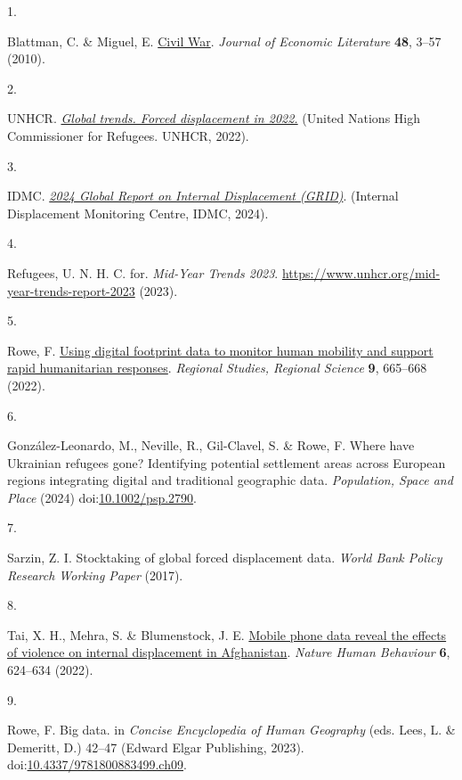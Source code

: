 \documentclass[
  11pt,
]{article}
\newlength{\cslhangindent}
\newlength{\csllabelwidth}
\newenvironment{CSLReferences}[2] %
 {\begin{list}{}{%
  \setlength{\itemindent}{0pt}
  \setlength{\leftmargin}{0pt}
  \setlength{\parsep}{0pt}
  \ifodd #1
   \setlength{\leftmargin}{\cslhangindent}
   \setlength{\itemindent}{-1\cslhangindent}
  \fi
  \setlength{\itemsep}{#2\baselineskip}}}
 {\end{list}}
\newcommand{\CSLLeftMargin}[1]{\parbox[t]{\csllabelwidth}{\strut#1\strut}}
\newcommand{\CSLRightInline}[1]{\parbox[t]{\linewidth - \csllabelwidth}{\strut#1\strut}}
\begin{document}
\label{refs}
\begin{CSLReferences}{0}{0}
\CSLLeftMargin{1. }%
\CSLRightInline{Blattman, C. \& Miguel, E.
\href{https://doi.org/10.1257/jel.48.1.3}{Civil War}. \emph{Journal of
Economic Literature} \textbf{48}, 3--57 (2010).}

\CSLLeftMargin{2. }%
\CSLRightInline{UNHCR. \emph{\href{}{Global trends. Forced displacement
in 2022.}} ({United Nations High Commissioner for Refugees. UNHCR},
2022).}

\CSLLeftMargin{3. }%
\CSLRightInline{IDMC. \emph{\href{}{2024 Global Report on Internal
Displacement {(GRID)}}}. ({Internal Displacement Monitoring Centre,
IDMC}, 2024).}

\CSLLeftMargin{4. }%
\CSLRightInline{Refugees, U. N. H. C. for. \emph{Mid-Year Trends 2023}.
\url{https://www.unhcr.org/mid-year-trends-report-2023} (2023).}

\CSLLeftMargin{5. }%
\CSLRightInline{Rowe, F.
\href{https://doi.org/10.1080/21681376.2022.2135458}{Using digital
footprint data to monitor human mobility and support rapid humanitarian
responses}. \emph{Regional Studies, Regional Science} \textbf{9},
665--668 (2022).}

\CSLLeftMargin{6. }%
\CSLRightInline{González-Leonardo, M., Neville, R., Gil-Clavel, S. \&
Rowe, F. Where have Ukrainian refugees gone? Identifying potential
settlement areas across European regions integrating digital and
traditional geographic data. \emph{Population, Space and Place} (2024)
doi:\href{https://doi.org/10.1002/psp.2790}{10.1002/psp.2790}.}

\CSLLeftMargin{7. }%
\CSLRightInline{Sarzin, Z. I. Stocktaking of global forced displacement
data. \emph{World Bank Policy Research Working Paper} (2017).}

\CSLLeftMargin{8. }%
\CSLRightInline{Tai, X. H., Mehra, S. \& Blumenstock, J. E.
\href{https://doi.org/10.1038/s41562-022-01336-4}{Mobile phone data
reveal the effects of violence on internal displacement in Afghanistan}.
\emph{Nature Human Behaviour} \textbf{6}, 624--634 (2022).}

\CSLLeftMargin{9. }%
\CSLRightInline{Rowe, F. Big data. in \emph{{Concise Encyclopedia of
Human Geography}} (eds. Lees, L. \& Demeritt, D.) 42--47 (Edward Elgar
Publishing, 2023).
doi:\href{https://doi.org/10.4337/9781800883499.ch09}{10.4337/9781800883499.ch09}.}


\end{CSLReferences}
\end{document}

